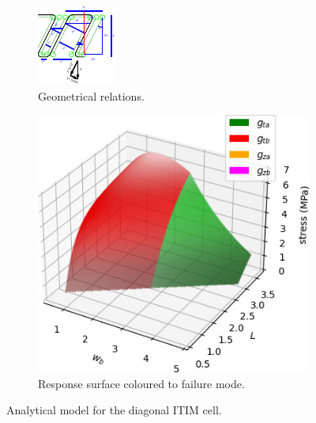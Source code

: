 \begin{figure}
	\centering
	\begin{subfigure}[B]{.4\columnwidth}
		\includegraphics{sources/method/diagonal_math.pdf}
		\caption{Geometrical relations.}
		\label{fig:analytical_math_diagonal}
	\end{subfigure}
	\begin{subfigure}[B]{.59\columnwidth}
		\includegraphics{sources/method/analytic_response_diagonal.jpg}
		\caption{Response surface coloured to failure mode.}
		\label{fig:analytic_response_diagonal}
	\end{subfigure}
	\caption{Analytical model for the diagonal ITIM cell.}
\end{figure}

